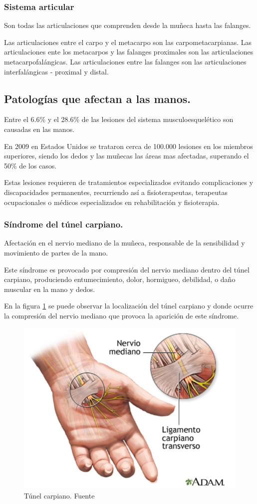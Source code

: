 \subsubsection{Sistema articular}

Son todas las articulaciones que comprenden desde la muñeca hasta las falanges. 

Las articulaciones entre el carpo y el metacarpo son las carpometacarpianas. Las articulaciones ente los metacarpos y las falanges proximales son las articulaciones metacarpofalángicas. Las articulaciones entre las falanges son las articulaciones interfalángicas - proximal y distal.
\subsection{Patologías que afectan a las manos.}

Entre el 6.6\% y el 28.6\% de las lesiones del sistema musculoesquelético son causadas en las manos.

En 2009 en Estados Unidos se trataron cerca de 100.000 lesiones en los miembros superiores, siendo los dedos y las muñecas las áreas mas afectadas, superando el 50\% de los casos.

Estas lesiones requieren de tratamientos especializados evitando complicaciones y discapacidades permanentes, recurriendo así a fisioterapeutas, terapeutas ocupacionales o médicos especializados en rehabilitación y fisioterapia.  
\subsubsection{Síndrome del túnel carpiano.}
Afectación en el nervio mediano de la muñeca, responsable de la sensibilidad y movimiento de partes de la mano.

Este síndrome es provocado por compresión del nervio  mediano dentro del túnel carpiano, produciendo entumecimiento, dolor, hormigueo, debilidad, o daño muscular en la mano y dedos. 

En la figura \ref{fig:Tunel_carpiano} se puede observar la localización del túnel carpiano y donde ocurre la compresión del nervio mediano que provoca la aparición de este síndrome. \cite{}
\begin{figure}
    \centering
    \includegraphics[width=0.5\linewidth]{img/Tunel_carpiano.png}
    \caption{Túnel carpiano. Fuente }
    \label{fig:Tunel_carpiano}
\end{figure}
